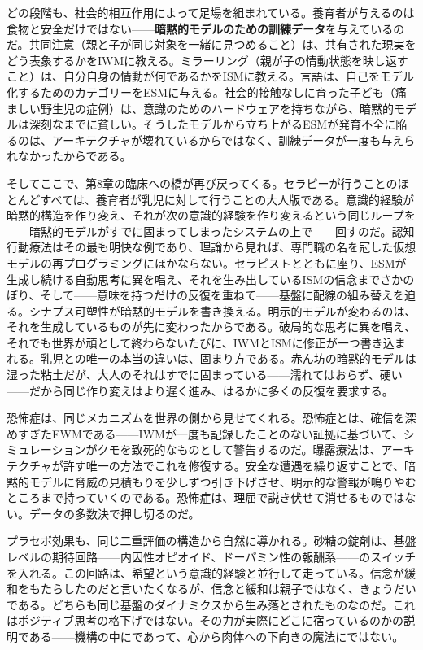 \documentclass[11pt, twoside, openright]{book}
\begin{document}
どの段階も、社会的相互作用によって足場を組まれている。養育者が与えるのは食物と安全だけではない------\textbf{暗黙的モデルのための訓練データ}を与えているのだ。共同注意（親と子が同じ対象を一緒に見つめること）は、共有された現実をどう表象するかをIWMに教える。ミラーリング（親が子の情動状態を映し返すこと）は、自分自身の情動が何であるかをISMに教える。言語は、自己をモデル化するためのカテゴリーをESMに与える。社会的接触なしに育った子ども（痛ましい野生児の症例）は、意識のためのハードウェアを持ちながら、暗黙的モデルは深刻なまでに貧しい。そうしたモデルから立ち上がるESMが発育不全に陥るのは、アーキテクチャが壊れているからではなく、訓練データが一度も与えられなかったからである。

そしてここで、第8章の臨床への橋が再び戻ってくる。セラピーが行うことのほとんどすべては、養育者が乳児に対して行うことの大人版である。意識的経験が暗黙的構造を作り変え、それが次の意識的経験を作り変えるという同じループを------暗黙的モデルがすでに固まってしまったシステムの上で------回すのだ。認知行動療法はその最も明快な例であり、理論から見れば、専門職の名を冠した仮想モデルの再プログラミングにほかならない。セラピストとともに座り、ESMが生成し続ける自動思考に異を唱え、それを生み出しているISMの信念までさかのぼり、そして------意味を持つだけの反復を重ねて------基盤に配線の組み替えを迫る。シナプス可塑性が暗黙的モデルを書き換える。明示的モデルが変わるのは、それを生成しているものが先に変わったからである。破局的な思考に異を唱え、それでも世界が頑として終わらないたびに、IWMとISMに修正が一つ書き込まれる。乳児との唯一の本当の違いは、固まり方である。赤ん坊の暗黙的モデルは湿った粘土だが、大人のそれはすでに固まっている------濡れてはおらず、硬い------だから同じ作り変えはより遅く進み、はるかに多くの反復を要求する。

恐怖症は、同じメカニズムを世界の側から見せてくれる。恐怖症とは、確信を深めすぎたEWMである------IWMが一度も記録したことのない証拠に基づいて、シミュレーションがクモを致死的なものとして警告するのだ。曝露療法は、アーキテクチャが許す唯一の方法でこれを修復する。安全な遭遇を繰り返すことで、暗黙的モデルに脅威の見積もりを少しずつ引き下げさせ、明示的な警報が鳴りやむところまで持っていくのである。恐怖症は、理屈で説き伏せて消せるものではない。データの多数決で押し切るのだ。

プラセボ効果も、同じ二重評価の構造から自然に導かれる。砂糖の錠剤は、基盤レベルの期待回路------内因性オピオイド、ドーパミン性の報酬系------のスイッチを入れる。この回路は、希望という意識的経験と並行して走っている。信念が緩和をもたらしたのだと言いたくなるが、信念と緩和は親子ではなく、きょうだいである。どちらも同じ基盤のダイナミクスから生み落とされたものなのだ。これはポジティブ思考の格下げではない。その力が実際にどこに宿っているのかの説明である------機構の中にであって、心から肉体への下向きの魔法にではない。
\end{document}
